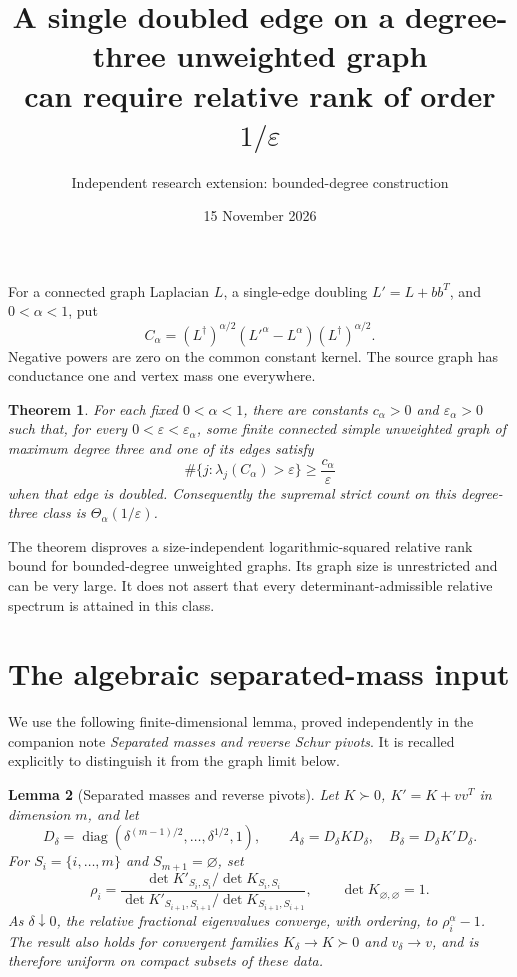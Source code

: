 \documentclass[11pt]{article}
\title{A single doubled edge on a degree-three unweighted graph\protect\\can require relative rank of order $1/\varepsilon$}
\author{Independent research extension: bounded-degree construction}
\date{15 November 2026}
\newtheorem{theorem}{Theorem}
\newtheorem{lemma}[theorem]{Lemma}
\newcommand{\diag}{\operatorname{diag}}
\begin{document}
\maketitle

For a connected graph Laplacian $L$, a single-edge doubling $L'=L+bb^T$,
and $0<\alpha<1$, put
\[
 C_\alpha=(L^\dagger)^{\alpha/2}(L'^\alpha-L^\alpha)
                    (L^\dagger)^{\alpha/2}.
\]
Negative powers are zero on the common constant kernel. The source graph
has conductance one and vertex mass one everywhere.

\begin{theorem}\label{thm:main}
For each fixed $0<\alpha<1$, there are constants $c_\alpha>0$ and
$\varepsilon_\alpha>0$ such that, for every
$0<\varepsilon<\varepsilon_\alpha$, some finite connected simple
unweighted graph of maximum degree three and one of its edges satisfy
\[
 \#\{j:\lambda_j(C_\alpha)>\varepsilon\}
                 \ge \frac{c_\alpha}{\varepsilon}
\]
when that edge is doubled. Consequently the supremal strict count on
this degree-three class is $\Theta_\alpha(1/\varepsilon)$.
\end{theorem}

The theorem disproves a size-independent logarithmic-squared relative
rank bound for bounded-degree unweighted graphs. Its graph size is
unrestricted and can be very large. It does not assert that every
determinant-admissible relative spectrum is attained in this class.

\section*{The algebraic separated-mass input}
We use the following finite-dimensional lemma, proved independently in
the companion note \emph{Separated masses and reverse Schur pivots}.
It is recalled explicitly to distinguish it from the graph limit below.

\begin{lemma}[Separated masses and reverse pivots]\label{lem:pivots}
Let $K\succ0$, $K'=K+vv^T$ in dimension $m$, and let
\[
 D_\delta=\diag(\delta^{(m-1)/2},\ldots,\delta^{1/2},1),\qquad
 A_\delta=D_\delta KD_\delta,\quad
 B_\delta=D_\delta K'D_\delta.
\]
For $S_i=\{i,\ldots,m\}$ and $S_{m+1}=\varnothing$, set
\[
 \rho_i=
 \frac{\det K'_{S_i,S_i}/\det K_{S_i,S_i}}
      {\det K'_{S_{i+1},S_{i+1}}/\det K_{S_{i+1},S_{i+1}}},
 \qquad \det K_{\varnothing,\varnothing}=1.
\]
As $\delta\downarrow0$, the relative fractional eigenvalues converge,
with ordering, to $\rho_i^\alpha-1$. The result also holds for convergent
families $K_\delta\to K\succ0$ and $v_\delta\to v$, and is therefore
uniform on compact subsets of these data.
\end{lemma}
\end{document}
